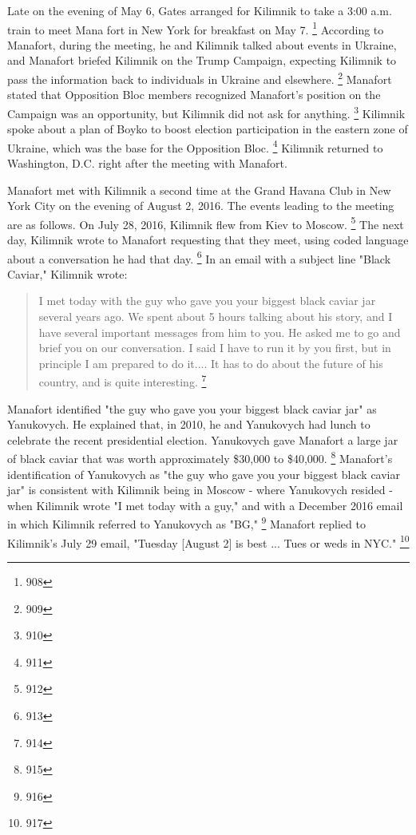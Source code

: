 Late on the evening of May 6, Gates arranged for Kilimnik to take a 3:00 a.m. train to meet Mana fort in New York for breakfast on May 7. %
\footnote{908}
According to Manafort, during the meeting, he and Kilimnik talked about events in Ukraine, and Manafort briefed Kilimnik on the Trump Campaign, expecting Kilimnik to pass the information back to individuals in Ukraine and elsewhere.%
\footnote{909}
Manafort stated that Opposition Bloc members recognized Manafort's position on the Campaign was an opportunity, but Kilimnik did not ask for anything.%
\footnote{910}
Kilimnik spoke about a plan of Boyko to boost election participation in the eastern zone of Ukraine, which was the base for the Opposition Bloc.%
\footnote{911}
Kilimnik returned to Washington, D.C. right after the meeting with Manafort.

Manafort met with Kilimnik a second time at the Grand Havana Club in New York City on the evening of August 2, 2016.
The events leading to the meeting are as follows.
On July 28, 2016, Kilimnik flew from Kiev to Moscow.%
\footnote{912}
The next day, Kilimnik wrote to Manafort requesting that they meet, using coded language about a conversation he had that day.%
\footnote{913}
In an email with a subject line "Black Caviar," Kilimnik wrote:

\begin{quote}
I met today with the guy who gave you your biggest black caviar jar several years ago.
We spent about 5 hours talking about his story, and I have several important messages from him to you.
He asked me to go and brief you on our conversation.
I said I have to run it by you first, but in principle I am prepared to do it....
It has to do about the future of his country, and is quite interesting.%
\footnote{914}
\end{quote}

Manafort identified "the guy who gave you your biggest black caviar jar" as Yanukovych.
He explained that, in 2010, he and Yanukovych had lunch to celebrate the recent presidential election.
Yanukovych gave Manafort a large jar of black caviar that was worth approximately \$30,000 to \$40,000.%
\footnote{915}
Manafort's identification of Yanukovych as "the guy who gave you your biggest black caviar jar" is consistent with Kilimnik being in Moscow - where Yanukovych resided - when Kilimnik wrote "I met today with a guy," and with a December 2016 email in which Kilimnik referred to Yanukovych as "BG,"
\footnote{916}
Manafort replied to Kilimnik's July 29 email, "Tuesday [August 2] is best ... Tues or weds in NYC."%
\footnote{917}

